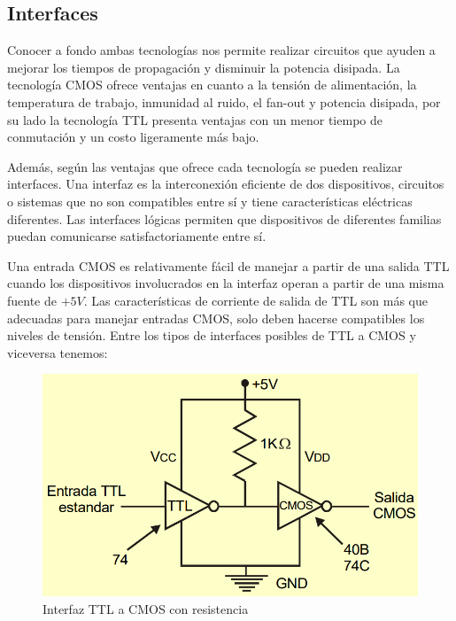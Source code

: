 \documentclass[journal]{IEEEtran}
\begin{document}
	\subsection{Interfaces}
	Conocer a fondo ambas tecnologías nos permite realizar circuitos que ayuden a mejorar los tiempos de propagación y disminuir la potencia disipada.
	La tecnología CMOS ofrece ventajas en cuanto a la tensión de alimentación, la temperatura de trabajo, inmunidad al ruido, el fan-out y potencia disipada, por su lado la tecnología TTL presenta ventajas con un menor tiempo de conmutación y un costo ligeramente más bajo.
	
	\vspace{5mm}
	
	Además, según las ventajas que ofrece cada tecnología se pueden realizar interfaces. Una interfaz es la interconexión eficiente de dos dispositivos, circuitos o sistemas que no son compatibles entre sí y tiene características eléctricas diferentes. Las interfaces lógicas permiten que dispositivos de diferentes familias puedan comunicarse satisfactoriamente entre sí. 
	
	\vspace{5mm}
	
	Una entrada CMOS es relativamente fácil de manejar a partir de una salida TTL cuando los dispositivos involucrados en la interfaz operan a partir de una misma fuente de $+5 V$. Las características de corriente de salida de TTL son más que adecuadas para manejar entradas CMOS, solo deben hacerse compatibles los niveles de tensión. Entre los tipos de interfaces posibles de TTL a CMOS y viceversa tenemos:
	
	\begin{figure}[!htb]
		\centering
		\includegraphics[scale = 0.25]{img/TTLCMOSRes.png}
		\caption{Interfaz TTL a CMOS con resistencia \cite{Ladelex}}
		\label{fig:TTLCMOSRes}
	\end{figure}
	
\end{document}
